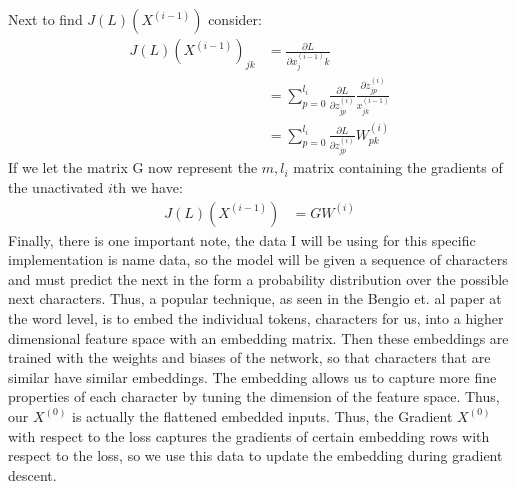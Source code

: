 \documentclass[12pt]{article}
\begin{document}
Next to find $J(L)(X^{(i-1)})$ consider:
\begin{align*}
    J(L)(X^{(i-1)})_{jk} &= \frac{\partial L}{\partial x^{(i-1)}_jk} \\
    &= \sum_{p = 0}^{l_i}\frac{\partial L}{\partial z^{(i)}_{jp}}\frac{\partial z^{(i)}_{jp}}{x^{(i-1)}_{jk}} \\
    &= \sum_{p = 0}^{l_i}\frac{\partial L}{\partial z^{(i)}_{jp}}W^{(i)}_{pk}
\end{align*}
If we let the matrix G now represent the $m, l_i$ matrix containing the gradients
of the unactivated $i$th we have:
\begin{align*}
    J(L)(X^{(i-1)}) &= GW^{(i)}
\end{align*}
Finally, there is one important note, the data I will be using for this specific
implementation is name data, so the model will be given a sequence of characters
and must predict the next in the form a probability distribution over the possible next characters.
Thus, a popular technique, as seen in the Bengio et. al paper at the word level, is to embed
the individual tokens, characters for us, into a higher dimensional feature space
with an embedding matrix. Then these embeddings are trained with the weights and biases
of the network, so that characters that are similar have similar embeddings. The embedding
allows us to capture more fine properties of each character by tuning the dimension of the
feature space. Thus, our $X^{(0)}$ is actually the flattened embedded inputs. Thus, the
Gradient $X^{(0)}$ with respect to the loss captures the gradients of certain
embedding rows with respect to the loss, so we use this data to update the embedding
during gradient descent.
\end{document}
